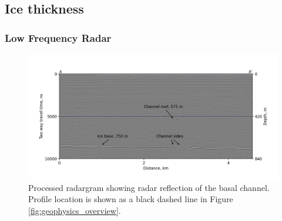 \subsection{Ice thickness} \label{sec:icethickness}

\subsubsection{Low Frequency Radar} \label{sec:radar}


\begin{figure}[!ht]
\centering
\includegraphics[width=1.1\textwidth]{chapters/2/radargram.png}
\caption[Example radargram]{Processed radargram showing radar reflection of the basal channel. Profile location is shown as a black dashed line in Figure \ref{fig:geophysics_overview}.}
\label{fig:radargram}
\end{figure}

